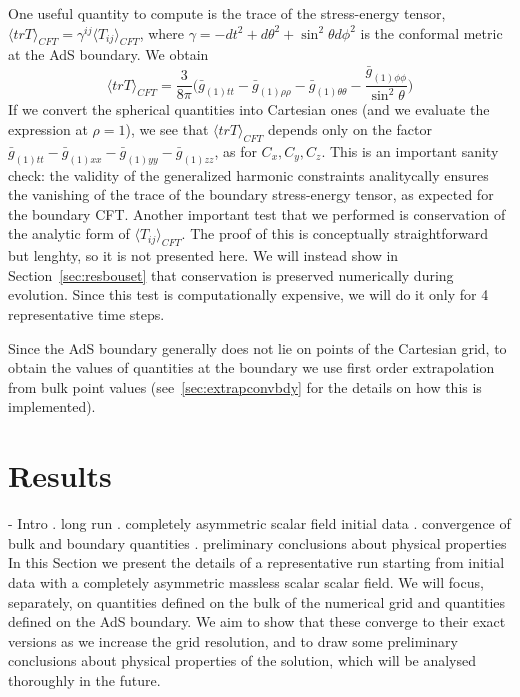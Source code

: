 \documentclass[12pt]{iopart} %
\begin{document}
One useful quantity to compute is the trace of the stress-energy tensor, $\langle trT\rangle_{CFT}=\gamma^{ij} \langle T_{ij}\rangle_{CFT}$, where $\gamma=-dt^2+d\theta^2+\sin^2\theta d\phi^2$ is the conformal metric at the AdS boundary. We obtain
\begin{equation}
\langle trT\rangle_{CFT}=\frac{3}{8\pi}\biggl(\bar{g}_{(1)tt}-\bar{g}_{(1)\rho\rho}-\bar{g}_{(1)\theta\theta}-\frac{\bar{g}_{(1)\phi\phi}}{\sin^2\theta}\biggr)
\end{equation}
If we convert the spherical quantities into Cartesian ones (and we evaluate the expression at $\rho=1$), we see that $\langle trT\rangle_{CFT}$ depends only on the factor $\bar{g}_{(1)tt}-\bar{g}_{(1)xx}-\bar{g}_{(1)yy}-\bar{g}_{(1)zz}$, as for $C_x,C_y,C_z$. This is an important sanity check: the validity of the generalized harmonic constraints analitycally ensures the vanishing of the trace of the boundary stress-energy tensor, as expected for the boundary CFT.
Another important test that we performed is conservation of the analytic form of $\langle T_{ij}\rangle_{CFT}$. The proof of this is conceptually straightforward but lenghty, so it is not presented here. We will instead show in Section~\ref{sec:resbouset} that conservation is preserved numerically during evolution. Since this test is computationally expensive, we will do it only for 4 representative time steps.

Since the AdS boundary generally does not lie on points of the Cartesian grid, to obtain the values of quantities at the boundary we use first order extrapolation from bulk point values (see~\ref{sec:extrapconvbdy} for the details on how this is implemented).

\section{Results}\label{sec:results}

- Intro
. long run 
. completely asymmetric scalar field initial data
. convergence of bulk and boundary quantities
. preliminary conclusions about physical properties
In this Section we present the details of a representative run starting from initial data with a completely asymmetric massless scalar scalar field. We will focus, separately, on quantities defined on the bulk of the numerical grid and quantities defined on the AdS boundary. We aim to show that these converge to their exact versions as we increase the grid resolution, and to draw some preliminary conclusions about physical properties of the solution, which will be analysed thoroughly in the future.
\end{document}
